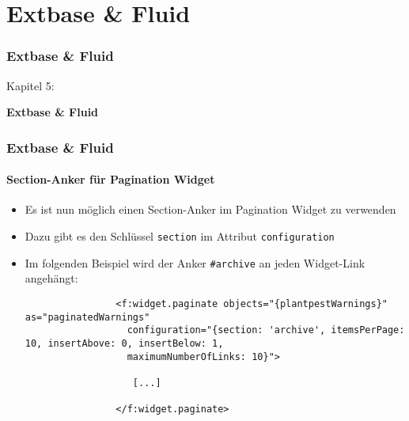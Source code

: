 %

\section{Extbase \& Fluid}
\begin{frame}[fragile]
	\frametitle{Extbase \& Fluid}

	\begin{center}\huge{Kapitel 5:}\end{center}
	\begin{center}\huge{\color{typo3darkgrey}\textbf{Extbase \& Fluid}}\end{center}

\end{frame}


\begin{frame}[fragile]
	\frametitle{Extbase \& Fluid}
	\framesubtitle{Section-Anker für Pagination Widget}

	\lstset{basicstyle=\tiny\ttfamily}

	\begin{itemize}

		\item Es ist nun möglich einen Section-Anker im Pagination Widget zu verwenden
		\item Dazu gibt es den Schlüssel \texttt{section} im Attribut \texttt{configuration}

		\item Im folgenden Beispiel wird der Anker \texttt{\#archive} an jeden Widget-Link angehängt:

			\begin{lstlisting}
				<f:widget.paginate objects="{plantpestWarnings}" as="paginatedWarnings"
				  configuration="{section: 'archive', itemsPerPage: 10, insertAbove: 0, insertBelow: 1,
				  maximumNumberOfLinks: 10}">

				   [...]

				</f:widget.paginate>
			\end{lstlisting}

	\end{itemize}

\end{frame}

